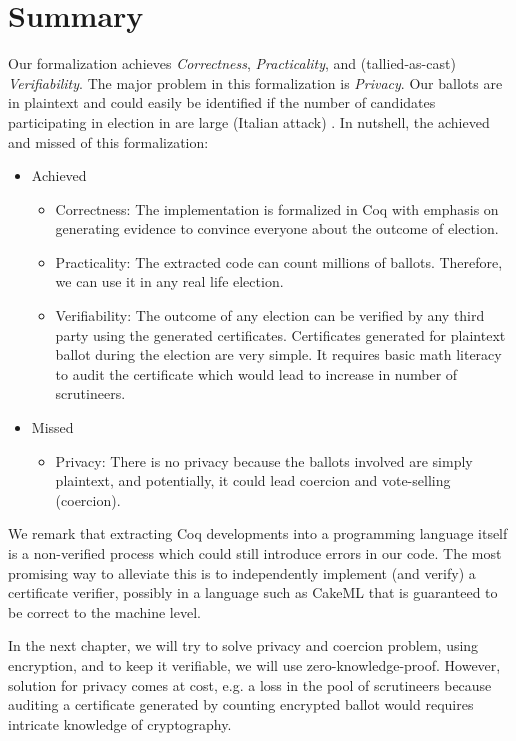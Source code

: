\section{Summary}

Our formalization achieves \textit{Correctness}, \textit{Practicality}, and 
(tallied-as-cast) \textit{Verifiability}. The major problem in this formalization is \textit{Privacy}.  
Our ballots are in plaintext and could easily be identified
if the number of candidates participating in election in 
are large (Italian attack) \citep{Otten}.
\noindent
In nutshell, the achieved and missed of this formalization:

\begin{itemize}
\item Achieved 
\begin{itemize}
\item Correctness: The implementation is formalized in Coq with emphasis on generating 
         evidence to convince everyone about the outcome of election.
\item Practicality: The extracted code can count millions of ballots. Therefore, we can use it 
          in any real life election.
\item Verifiability: The outcome of any election can be verified by any third party using 
		  the generated certificates. Certificates generated for plaintext ballot 
		  during the election 
          are very simple.  It requires basic math literacy to audit the certificate which would 
          lead to increase in number of scrutineers. 

\end{itemize}
\item Missed
\begin{itemize}
\item Privacy: There is no privacy  because the ballots involved 
         are simply plaintext, and potentially, it could lead coercion and vote-selling (coercion).
\end{itemize}
\end{itemize}

We remark that extracting Coq developments into a
programming language itself is a non-verified process which could
still introduce errors in our code. The most promising way to
alleviate this is to independently implement (and verify) a
certificate verifier, possibly in a language such as CakeML
\citep{Kumar:2014:CVI} that is guaranteed to
be correct to the machine level. 

 In the next chapter, we will try to solve privacy and coercion problem, using encryption, and to keep 
 it verifiable, we will use zero-knowledge-proof. However, solution for privacy comes at cost, e.g. 
 a loss in the pool of scrutineers because auditing a certificate generated by counting encrypted ballot 
 would requires intricate knowledge of cryptography.
 

